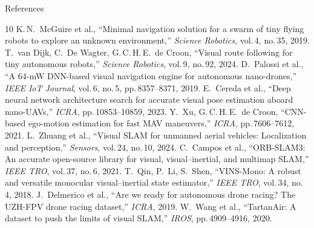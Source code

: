 \documentclass[aspectratio=169, 10pt]{beamer}
\begin{document}
\begin{frame}[allowframebreaks]{References}
\scriptsize
\begin{thebibliography}{10}
 K.\,N.\ McGuire et al., ``Minimal navigation solution for a swarm of tiny flying robots to explore an unknown environment,'' \emph{Science Robotics}, vol.\,4, no.\,35, 2019.
 T.\ van Dijk, C.\ De Wagter, G.\,C.\,H.\,E.\ de Croon, ``Visual route following for tiny autonomous robots,'' \emph{Science Robotics}, vol.\,9, no.\,92, 2024.
 D.\ Palossi et al., ``A 64-mW DNN-based visual navigation engine for autonomous nano-drones,'' \emph{IEEE IoT Journal}, vol.\,6, no.\,5, pp.\,8357--8371, 2019.
 E.\ Cereda et al., ``Deep neural network architecture search for accurate visual pose estimation aboard nano-UAVs,'' \emph{ICRA}, pp.\,10853--10859, 2023.
 Y.\ Xu, G.\,C.\,H.\,E.\ de Croon, ``CNN-based ego-motion estimation for fast MAV maneuvers,'' \emph{ICRA}, pp.\,7606--7612, 2021.
 L.\ Zhuang et al., ``Visual SLAM for unmanned aerial vehicles: Localization and perception,'' \emph{Sensors}, vol.\,24, no.\,10, 2024.
 C.\ Campos et al., ``ORB-SLAM3: An accurate open-source library for visual, visual--inertial, and multimap SLAM,'' \emph{IEEE TRO}, vol.\,37, no.\,6, 2021.
 T.\ Qin, P.\ Li, S.\ Shen, ``VINS-Mono: A robust and versatile monocular visual--inertial state estimator,'' \emph{IEEE TRO}, vol.\,34, no.\,4, 2018.
 J.\ Delmerico et al., ``Are we ready for autonomous drone racing? The UZH-FPV drone racing dataset,'' \emph{ICRA}, 2019.
 W.\ Wang et al., ``TartanAir: A dataset to push the limits of visual SLAM,'' \emph{IROS}, pp.\,4909--4916, 2020.
\end{thebibliography}
\end{frame}
\end{document}
